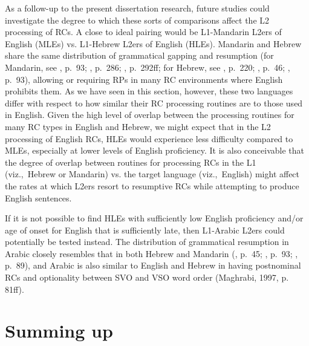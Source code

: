 As a follow-up to the present dissertation research, future studies could investigate the degree to which these sorts of comparisons affect the L2 processing of RCs. A close to ideal pairing would be L1-Mandarin L2ers of English (MLEs) vs. L1-Hebrew L2ers of English (HLEs). Mandarin and Hebrew share the same distribution of grammatical gapping and resumption (for Mandarin, see \cite{keenan.comrie1977}, p.~93; \cite{li.wei2014}, p.~286; \cite{pan2016}, p.~292ff; for Hebrew, see \cite{borer1984}, p.~220; \cite{fadlon.etal2019}, p.~46; \cite{keenan.comrie1977}, p.~93), allowing or requiring RPs in many RC environments where English prohibits them. As we have seen in this section, however, these two languages differ with respect to how similar their RC processing routines are to those used in English. Given the high level of overlap between the processing routines for many RC types in English and Hebrew, we might expect that in the L2 processing of English RCs, HLEs would experience less difficulty compared to MLEs, especially at lower levels of English proficiency. It is also conceivable that the degree of overlap between routines for processing RCs in the L1 (viz.,~Hebrew or Mandarin) vs. the target language (viz.,~English) might affect the rates at which L2ers resort to resumptive RCs while attempting to produce English sentences.\footnotemark{}


If it is not possible to find HLEs with sufficiently low English proficiency and/or age of onset for English that is sufficiently late, then L1-Arabic L2ers could potentially be tested instead. The distribution of grammatical resumption in Arabic closely resembles that in both Hebrew and Mandarin (\cite{algady2013}, p.~45; \cite{keenan.comrie1977}, p.~93; \cite{maghrabi1997}, p.~89), and Arabic is also similar to English and Hebrew in having postnominal RCs and optionality between SVO and VSO word order (Maghrabi, 1997, p. 81ff). 

\section{Summing up}\label{dis-conclusion}

